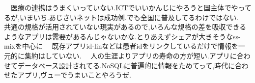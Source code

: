 　医療の連携はうまくいっていない.ICTでいいかんじにやろうと国主体でやってるが,いまいち.あじさいネットは成功例.でも全国に普及してるわけではない.\cite{bibi3}
　共通の規格が活用されていない現実があるので,いろんな規格の差を吸収できるようなアプリは需要があるんじゃないかな.とりあえずシェアが大きそうなss-mixを中心に
　既存アプリid-linなどは患者idをリンクしているだけで情報を一元的に集約はしていない.
　人の生涯よりアプリの寿命の方が短い.アプリに合わせてデータベース設計されてる.NoSQLに普遍的に情報をためてって,時代に合わせたアプリ,ヴューでうまいことやろうぜ.
